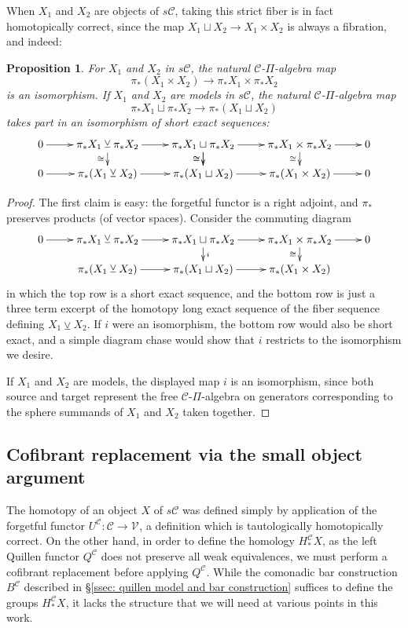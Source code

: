 \documentclass[11pt]{amsart} \renewcommand{\baselinestretch}{1.2}
\theoremstyle{plain}
\newtheorem{prop}[thm]{Proposition}
\theoremstyle{definition}
\renewcommand{\to}{\longrightarrow}
\newcommand{\calV}{\mathcal{V}}
\newcommand{\calc}{\mathcal{C}}
\newcommand{\vect}[2]{\calV^{#1}_{#2}}
\newcommand{\smashcoprod}{\veebar}%
\begin{document}
\begin{Pi-algebras and cohomology algebras}
When $X_1$ and $X_2$ are  objects of $s\calc$, taking this strict fiber is in fact homotopically correct, since the map $X_1\sqcup X_2\to X_1\times X_2$ is always a fibration, and indeed:
\begin{prop}
\label{smash coprod}
For $X_1$ and $X_2$ in $s\calc$, the natural $\calc$-$\Pi$-algebra map
\[\pi_*(X_1\times X_2)\to \pi_* X_1\times \pi_* X_2\]
 is an isomorphism. If $X_1$ and $X_2$ are models in $s\calc$, the natural $\calc$-$\Pi$-algebra map 
\[\pi_* X_1\sqcup \pi_* X_2\to\pi_*(X_1\sqcup X_2)\]
takes part in an isomorphism of short exact sequences:
\[\xymatrix@R=4mm{
0\ar[r]&%
\pi_* X_1\smashcoprod \pi_* X_2
\ar[r]\ar[d]_-{\cong}
&%
\pi_* X_1\sqcup \pi_* X_2
\ar[r]
\ar[d]_-{\cong}\ar[d]_-{\cong}
&%
\pi_* X_1\times \pi_* X_2
\ar[r]
\ar[d]_-{\cong}
&%
0\\%
0\ar[r]&%
\pi_* (X_1\smashcoprod  X_2)
\ar[r]
&%
\pi_* (X_1\sqcup X_2)
\ar[r]
&%
\pi_* (X_1\times X_2)
\ar[r]&0
}\]
\end{prop}
\begin{proof}
The first claim is easy: the forgetful functor is a right adjoint, and $\pi_*$ preserves products (of vector spaces). Consider the commuting diagram
\[\xymatrix@R=4mm{
0\ar[r]&%
\pi_* X_1\smashcoprod \pi_* X_2
\ar[r]
&%
\pi_* X_1\sqcup \pi_* X_2
\ar[r]
\ar[d]^-{i}
&%
\pi_* X_1\times \pi_* X_2
\ar[r]
\ar[d]_-{\cong}
&%
0\\%
&%
\pi_* (X_1\smashcoprod  X_2)
\ar[r]
&%
\pi_* (X_1\sqcup X_2)
\ar[r]
&%
\pi_* (X_1\times X_2)
}\]
in which the top row is a short exact sequence, and the bottom row is just a three term excerpt of the homotopy long exact sequence of the fiber sequence defining $X_1\smashcoprod X_2$. If $i$ were an isomorphism, the bottom row would also be short exact, and a simple diagram chase would show that $i$ restricts to the isomorphism we desire.


If $X_1$ and $X_2$ are models, the displayed map $i$ is an isomorphism, since both source and target represent the free $\calc$-$\Pi$-algebra on generators corresponding to the sphere summands of $X_1$ and $X_2$ taken together. 
\end{proof}

\subsection{Cofibrant replacement via the small object argument}\label{Cofibrant replacement via the small object argument}
The homotopy of an object $X$ of $s\calc$ was defined simply by application of the forgetful functor $U^{\calc}:\calc\to\vect{}{}$, a definition which is tautologically homotopically correct. On the other hand, in order to define the homology $H_*^{\calc}X$, as the left Quillen functor $Q^{\calc}$ does not preserve all weak equivalences, we must perform a cofibrant replacement before applying $Q^{\calc}$. While the comonadic bar construction $B^{\calc}$ described in \S\ref{ssec: quillen model and bar construction} suffices to define the groups $H_*^{\calc}X$, it lacks the structure that we will need at various points in this work.


\end{Pi-algebras and cohomology algebras}
\end{document}
